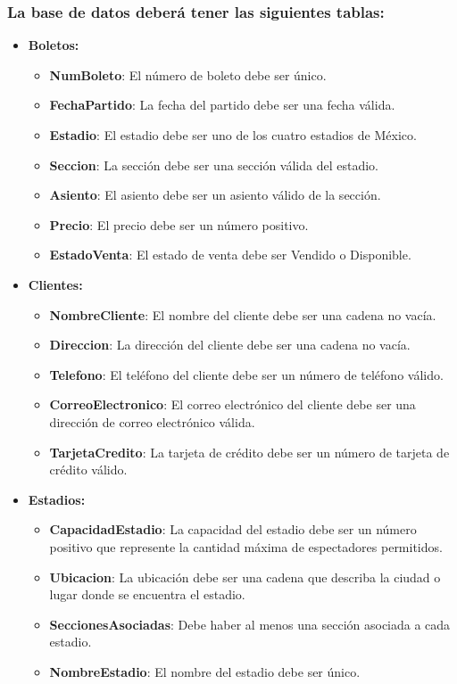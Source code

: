\subsubsection*{La base de datos deberá tener las siguientes tablas:}
\begin{itemize}
    \item \textbf{Boletos:}
    \begin{itemize}
        \item \textbf{NumBoleto}: El número de boleto debe ser único.
        \item \textbf{FechaPartido}: La fecha del partido debe ser una fecha válida.
        \item \textbf{Estadio}: El estadio debe ser uno de los cuatro estadios de México.
        \item \textbf{Seccion}: La sección debe ser una sección válida del estadio.
        \item \textbf{Asiento}: El asiento debe ser un asiento válido de la sección.
        \item \textbf{Precio}: El precio debe ser un número positivo.
        \item \textbf{EstadoVenta}: El estado de venta debe ser Vendido o Disponible.
    \end{itemize}

    \item \textbf{Clientes:}
    \begin{itemize}
        \item \textbf{NombreCliente}: El nombre del cliente debe ser una cadena no vacía.
        \item \textbf{Direccion}: La dirección del cliente debe ser una cadena no vacía.
        \item \textbf{Telefono}: El teléfono del cliente debe ser un número de teléfono válido.
        \item \textbf{CorreoElectronico}: El correo electrónico del cliente debe ser una dirección de correo electrónico válida.
        \item \textbf{TarjetaCredito}: La tarjeta de crédito debe ser un número de tarjeta de crédito válido.
    \end{itemize}

    \item \textbf{Estadios:}
    \begin{itemize}
        \item \textbf{CapacidadEstadio}: La capacidad del estadio debe ser un número positivo que represente la cantidad máxima de espectadores permitidos.
        \item \textbf{Ubicacion}: La ubicación debe ser una cadena que describa la ciudad o lugar donde se encuentra el estadio.
        \item \textbf{SeccionesAsociadas}: Debe haber al menos una sección asociada a cada estadio.
        \item \textbf{NombreEstadio}: El nombre del estadio debe ser único.
    \end{itemize}


\end{itemize}
